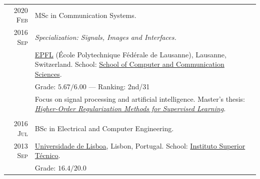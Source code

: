 \documentclass[a4paper,11pt]{article}
\begin{document}
    \begin{tabular}{r|p{13cm}}


      \textsc{2020 Feb}  &
      MSc in Communication Systems. \\
      \textsc{2016 Sep} & \emph{Specialization: Signals, Images and Interfaces.} \\
      & \footnotesize{\href{https://www.epfl.ch/en/}{EPFL} (École Polytechnique Fédérale de Lausanne), Lausanne, Switzerland. \newline
      School: \href{https://www.epfl.ch/schools/ic/}{School of Computer and Communication Sciences}.
      } \\
      & \footnotesize{
      Grade: $\bm{5.67/6.00}$} — Ranking: 2nd/31 \\
      & \footnotesize{
        Focus on signal processing and artificial intelligence. \newline
        Master's thesis: \href{https://www.joaquimcampos.com/assets/pubs/MSc_thesis.pdf}{\emph{Higher-Order Regularization Methods for Supervised Learning}}. 
      } \\
      \multicolumn{2}{c}{} \\

      \textsc{\phantom{5}2016 Jul} &
      BSc in Electrical and Computer Engineering. \\
      \textsc{2013 Sep} &  \footnotesize{
        \href{https://www.ulisboa.pt/en}{Universidade de Lisboa}, Lisbon, Portugal. \newline
        School: \href{https://tecnico.ulisboa.pt/en/}{Instituto Superior Técnico}.
      } \\
      & \footnotesize{Grade: $\bm{16.4/20.0}$}
    \end{tabular}
\end{document}
